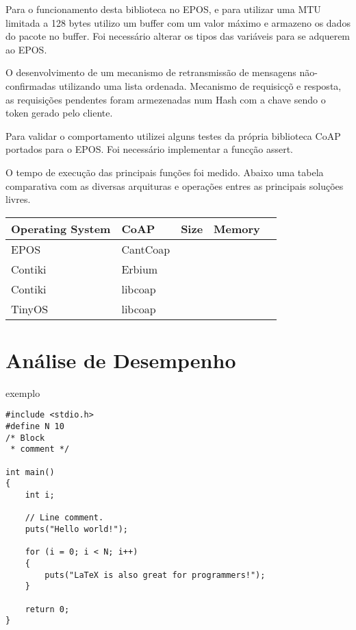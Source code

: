 Para o funcionamento desta biblioteca no EPOS, e para utilizar uma MTU limitada a 128 bytes utilizo um buffer com um valor m\'aximo e armazeno os dados do pacote no buffer. Foi necess\'ario alterar os tipos das vari\'aveis para se adquerem ao EPOS.

O desenvolvimento de um mecanismo de retransmiss\~ao de mensagens n\~ao-confirmadas utilizando uma lista ordenada. Mecanismo de requisic\c{c}\~o e resposta, as requisi\c{c}\~oes pendentes foram armezenadas num Hash com a chave sendo o token gerado pelo cliente.

Para validar o comportamento utilizei alguns testes da pr\'opria biblioteca CoAP portados para o EPOS. Foi necess\'ario implementar a func\c{c}\~ao assert.

O tempo de execu\c{c}\~ao das principais fun\c{c}\~oes foi medido. Abaixo uma tabela comparativa com as diversas arquituras e opera\c{c}\~oes entres as principais solu\c{c}\~oes livres.

\begin{table}[h]
\begin{tabular}{@{}lllll@{}}
\toprule
Operating System & CoAP & Size &  Memory &  &  \\ \midrule
EPOS &  CantCoap &  &  &  \\
Contiki &  Erbium &  &  &  \\
Contiki &  libcoap &  &  &  \\
TinyOS &  libcoap &  &  &  \\ \bottomrule
\end{tabular}
\end{table}

\section{An\'alise de Desempenho}
exemplo


\lstset{escapechar=@,style=customc}

\begin{lstlisting}
#include <stdio.h>
#define N 10
/* Block
 * comment */
 
int main()
{
    int i;
 
    // Line comment.
    puts("Hello world!");
 
    for (i = 0; i < N; i++)
    {
        puts("LaTeX is also great for programmers!");
    }
 
    return 0;
}
\end{lstlisting}
